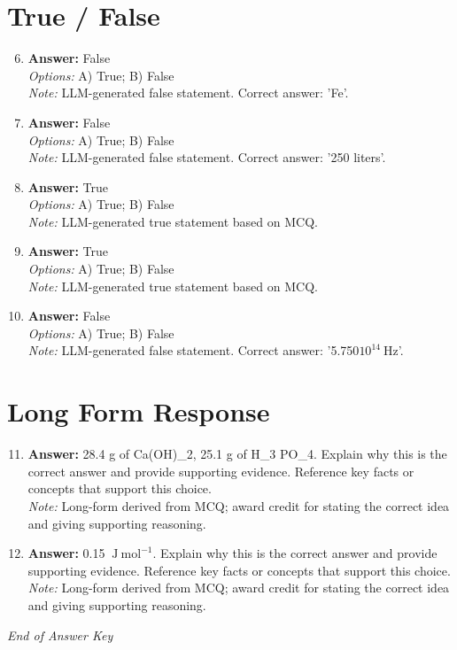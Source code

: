 \documentclass[12pt]{article}
\begin{document}
\section*{True / False}
\begin{enumerate}[label=\arabic*.]
\setcounter{enumi}{5}
\item \textbf{Answer:} False
\\ \textit{Options:} A) True; B) False
\\ \textit{Note:} LLM-generated false statement. Correct answer: 'Fe'.
\item \textbf{Answer:} False
\\ \textit{Options:} A) True; B) False
\\ \textit{Note:} LLM-generated false statement. Correct answer: '250 liters'.
\item \textbf{Answer:} True
\\ \textit{Options:} A) True; B) False
\\ \textit{Note:} LLM-generated true statement based on MCQ.
\item \textbf{Answer:} True
\\ \textit{Options:} A) True; B) False
\\ \textit{Note:} LLM-generated true statement based on MCQ.
\item \textbf{Answer:} False
\\ \textit{Options:} A) True; B) False
\\ \textit{Note:} LLM-generated false statement. Correct answer: '5.750$10^{14} \mathrm{~Hz}$'.
\end{enumerate}

\section*{Long Form Response}
\begin{enumerate}[label=\arabic*.]
\setcounter{enumi}{10}
\item \textbf{Answer:} 28.4 g of Ca(OH)\_2, 25.1 g of H\_3 PO\_4. Explain why this is the correct answer and provide supporting evidence. Reference key facts or concepts that support this choice.
\\ \textit{Note:} Long-form derived from MCQ; award credit for stating the correct idea and giving supporting reasoning.
\item \textbf{Answer:} 0.15 $\mathrm{~J} \mathrm{~mol}^{-1}$. Explain why this is the correct answer and provide supporting evidence. Reference key facts or concepts that support this choice.
\\ \textit{Note:} Long-form derived from MCQ; award credit for stating the correct idea and giving supporting reasoning.
\end{enumerate}

\vfill
\noindent\textit{End of Answer Key}
\end{document}
